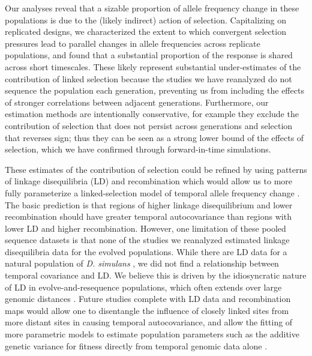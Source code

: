 \documentclass[9pt,twocolumn,twoside]{pnas-new}
\begin{document}
Our analyses reveal that a sizable proportion of allele frequency change in
these populations is due to the (likely indirect) action of selection.
Capitalizing on replicated designs, we characterized the extent to which
convergent selection pressures lead to parallel changes in allele frequencies
across replicate populations, and found that a substantial proportion of
the response is shared across short timescales. These likely represent
substantial under-estimates of the contribution of linked selection because the
studies we have reanalyzed do not sequence the population each generation,
preventing us from including the effects of stronger correlations between
adjacent generations.  Furthermore, our estimation methods are intentionally
conservative, for example they exclude the contribution of selection that does
not persist across generations and selection that reverses sign; thus they can
be seen as a strong lower bound of the effects of selection, which we have
confirmed through forward-in-time simulations.

These estimates of the contribution of selection could be refined by using
patterns of linkage disequilibria (LD) and recombination which would allow
us to more fully parameterize a linked-selection model of temporal allele
frequency change \cite{Buffalo2019-io}. The basic prediction is that
regions of higher linkage disequilibrium and lower recombination should have
greater temporal autocovariance than regions with lower LD and higher
recombination. However, one limitation of these pooled sequence datasets is
that none of the studies we reanalyzed estimated linkage disequilibria data for
the evolved populations.  While there are LD data for a natural population of
\emph{D. simulans} \cite{Signor2018-wg,Howie2018-ay},  we did not find a
relationship between temporal covariance and LD.  We believe this is driven by
the idiosyncratic nature of LD in evolve-and-resequence populations, which
often extends over large genomic distances
\cite{Nuzhdin2013-gf,Kelly2019-dc}. Future studies complete with LD data
and recombination maps would allow one to disentangle the influence of closely
linked sites from more distant sites in causing temporal autocovariance, and
allow the fitting of more parametric models to estimate population parameters
such as the additive genetic variance for fitness directly from temporal
genomic data alone \cite{Buffalo2019-io}.
\end{document}
